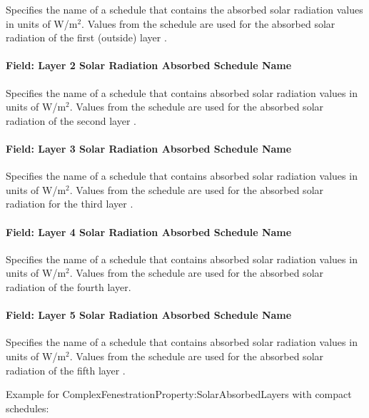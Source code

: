 Specifies the name of a schedule that contains the absorbed solar radiation values in units of W/m\(^{2}\). Values from the schedule are used for the absorbed solar radiation of the first (outside) layer .

\paragraph{Field: Layer 2 Solar Radiation Absorbed Schedule Name}\label{field-layer-2-solar-radiation-absorbed-schedule-name}

Specifies the name of a schedule that contains absorbed solar radiation values in units of W/m\(^{2}\). Values from the schedule are used for the absorbed solar radiation of the second layer .

\paragraph{Field: Layer 3 Solar Radiation Absorbed Schedule Name}\label{field-layer-3-solar-radiation-absorbed-schedule-name}

Specifies the name of a schedule that contains absorbed solar radiation values in units of W/m\(^{2}\). Values from the schedule are used for the absorbed solar radiation for the third layer .

\paragraph{Field: Layer 4 Solar Radiation Absorbed Schedule Name}\label{field-layer-4-solar-radiation-absorbed-schedule-name}

Specifies the name of a schedule that contains absorbed solar radiation values in units of W/m\(^{2}\). Values from the schedule are used for the absorbed solar radiation of the fourth layer.

\paragraph{Field: Layer 5 Solar Radiation Absorbed Schedule Name}\label{field-layer-5-solar-radiation-absorbed-schedule-name}

Specifies the name of a schedule that contains absorbed solar radiation values in units of W/m\(^{2}\). Values from the schedule are used for the absorbed solar radiation of the fifth layer .

Example for ComplexFenestrationProperty:SolarAbsorbedLayers with compact schedules:

